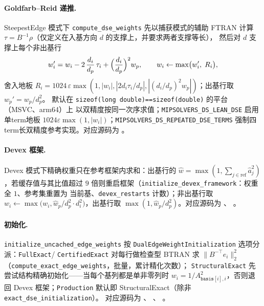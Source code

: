 \paragraph{Goldfarb--Reid 递推.}
SteepestEdge 模式下 \texttt{compute\_dse\_weights} 先以捕获模式的辅助 FTRAN 计算
$\tau = B^{-1}\rho$（仅定义在入基方向 $d$ 的支撑上，并要求两者支撑等长），
然后对 $d$ 支撑上每个非出基行
\begin{equation}
  w_i' = w_i - 2\,\frac{d_i}{d_p}\,\tau_i
         + \Bigl(\frac{d_i}{d_p}\Bigr)^{2} w_p,\qquad
  w_i \leftarrow \max\bigl(w_i',\; R_i\bigr),
  \label{eq:lpkernel:dse-recurrence}
\end{equation}
舍入地板 $R_i = 1024\,\varepsilon \max(1, |w_i|, |2 d_i \tau_i / d_p|,
|(d_i/d_p)^2 w_p|)$；出基行取 $w_p' = w_p / d_p^{2}$。
默认在 \texttt{sizeof(long double)==sizeof(double)} 的平台（MSVC、arm64）上
以双精度按同一次序求值；\texttt{MIPSOLVERS\_DS\_LEAN\_DSE} 启用单term地板
$1024\varepsilon\max(1, |w_i|)$；\texttt{MIPSOLVERS\_DS\_REPEATED\_DSE\_TERMS}
强制四term长双精度参考实现。对应源码为
。

\paragraph{Devex 框架.}
Devex 模式下精确权重只在参考框架内求和：出基行的
$\hat w = \max(1, \sum_{j \in \text{ref}} \hat a_j^2)$，若缓存值与其比值超过
$9$ 倍则重启框架（\texttt{initialize\_devex\_framework}：权重全 $1$、参考集重置为
当前基、\texttt{devex\_restarts} 计数）；非出基行取
$w_i \leftarrow \max\bigl(w_i, \hat w_p / d_p^2 \cdot d_i^2\bigr)$，出基行取
$\max(1, \hat w_p / d_p^2)$。对应源码为
、
。

\paragraph{初始化.}
\texttt{initialize\_uncached\_edge\_weights} 按
\texttt{DualEdgeWeightInitialization} 选项分派：\texttt{FullExact}/
\texttt{CertifiedExact} 对每行做检查型 BTRAN 求 $\|B^{-\top} e_i\|_2^2$
（\texttt{compute\_exact\_edge\_weights}，批量，累计精化次数）；
\texttt{StructuralExact} 先尝试结构精确初始化——当每个基列都是单非零列时
$w_i = 1/A_{\texttt{basis}[i], i}^{2}$，否则退回 Devex 框架；\texttt{Production}
默认即 StructuralExact（除非 \texttt{exact\_dse\_initialization}）。
对应源码为 、
、
。

